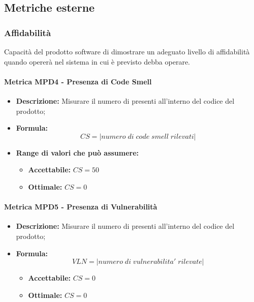        
\subsection{Metriche esterne}

\subsubsection{Affidabilità}
Capacità del prodotto software di dimostrare un adeguato livello di affidabilità quando opererà nel sistema in cui è previsto debba operare.

\paragraph{Metrica MPD4 - Presenza di Code Smell} %
\begin{itemize}
	\item \textbf{Descrizione:} Misurare il numero di  presenti all'interno del codice del prodotto;
	\item \textbf{Formula:} $$CS = {|numero \; di \; code \; smell \; rilevati|}$$
		\item \textbf{Range di valori che può assumere:}
	\begin{itemize}
		\item \textbf{Accettabile:} $CS = 50 $
		\item \textbf{Ottimale:} $CS = 0 $
	\end{itemize}
\end{itemize}

\paragraph{Metrica MPD5 - Presenza di Vulnerabilità} %
\begin{itemize}
	\item \textbf{Descrizione:} Misurare il numero di  presenti all'interno del codice del prodotto;
	\item \textbf{Formula:} $$VLN = {|numero \; di \; vulnerabilita' \; rilevate|}$$
		\begin{itemize}
		\item \textbf{Accettabile:} $CS = 0 $
		\item \textbf{Ottimale:} $CS = 0 $
	\end{itemize}
\end{itemize}

